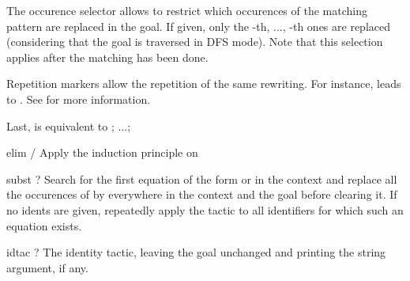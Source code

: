 {  \smallskip
  
  The occurence selector  allows to restrict which occurences
  of the matching pattern are replaced in the goal. If given, only the
  -th, ..., -th ones are replaced (considering that the goal is
  traversed in DFS mode). Note that this selection applies after the matching has
  been done.
  
  \medskip
  
  Repetition markers allow the repetition of the same rewriting. For instance,
  \tacname{}  leads to  \tacname{} . See  for
  more information.
  
  \medskip

  Last, \tacname{}  is equivalent to
  \tacname{} ; ...; \tacname{} }

\addAuto
{elim}
{$\!\!$/ }
{Apply the induction principle  on }

\addAuto
{subst}
{?}
{Search for the first equation of the form  or  in the context
 and replace all the occurences of  by  everywhere in the context and the
 goal before clearing it. If no idents are given, repeatedly apply the tactic to
 all identifiers for which such an equation exists.}



\addOther
{idtac}
{?}
{The identity tactic, leaving the goal unchanged and printing the string argument, if any.}
